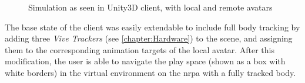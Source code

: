 \begin{figure}[h]
    \centering
    \hfill
    \caption{Simulation as seen in Unity3D client, with local and remote avatars}
    \label{fig:unityClientLocalRemote}
\end{figure}

The base state of the client was easily extendable to include full body tracking by adding three \textit{Vive Trackers} (see \autoref{chapter:Hardware}) to the scene, and assigning them to the corresponding animation targets of the local avatar. 
\newline
After this modification, the user is able to navigate the play space (shown as a box with white borders) in the virtual environment on the \gls{nrpa} with a fully tracked body.